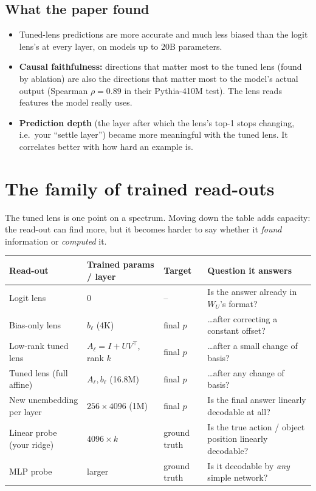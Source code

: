 \documentclass[11pt]{article}
\begin{document}
\subsection{What the paper found}
\begin{itemize}
  \item Tuned-lens predictions are more accurate and much less biased than the logit lens's at every layer, on models up to 20B parameters.
  \item \textbf{Causal faithfulness:} directions that matter most to the tuned lens (found by ablation) are also the directions that matter most to the model's actual output (Spearman $\rho=0.89$ in their Pythia-410M test). The lens reads features the model really uses.
  \item \textbf{Prediction depth} (the layer after which the lens's top-1 stops changing, i.e.\ your ``settle layer'') became more meaningful with the tuned lens. It correlates better with how hard an example is.
\end{itemize}

\section{The family of trained read-outs}
\label{sec:capacity}

The tuned lens is one point on a spectrum. Moving down the table adds capacity: the read-out can find more, but it becomes harder to say whether it \emph{found} information or \emph{computed} it.

\begin{center}
\small
\begin{tabularx}{\linewidth}{@{}lllX@{}}
\toprule
Read-out & Trained params / layer & Target & Question it answers \\
\midrule
Logit lens & 0 & -- & Is the answer already in $W_U$'s format? \\
Bias-only lens & $b_\ell$ (4K) & final $p$ & \ldots after correcting a constant offset? \\
Low-rank tuned lens & $A_\ell = I + UV^\top$, rank $k$ & final $p$ & \ldots after a small change of basis? \\
Tuned lens (full affine) & $A_\ell, b_\ell$ (16.8M) & final $p$ & \ldots after any change of basis? \\
New unembedding per layer & $256\times4096$ (1M) & final $p$ & Is the final answer linearly decodable at all? \\
Linear probe (your ridge) & $4096\times k$ & ground truth & Is the true action / object position linearly decodable? \\
MLP probe & larger & ground truth & Is it decodable by \emph{any} simple network? \\
\bottomrule
\end{tabularx}
\end{center}
\end{document}

